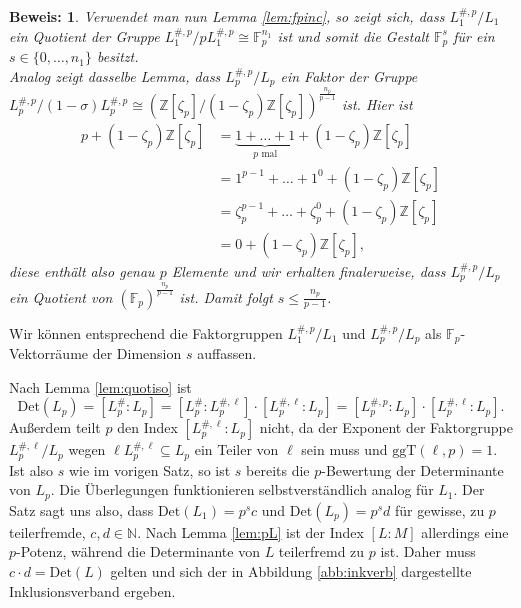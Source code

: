 \documentclass[12pt,a4paper,halfparskip,headsepline,bibtotocnumbered]{scrreprt}
\theoremstyle{nummermitklammern}
\theoremstyle{nonumberbreak}
\newtheorem{beweis}{Beweis:}
\newcommand{\N}{\mathbb{N}}
\newcommand{\Z}{\mathbb{Z}}
\newcommand{\F}{\mathbb{F}}
\newcommand{\Det}{\text{Det}}
\newcommand{\ggT}{\text{ggT}}
\begin{document}
\begin{beweis}
	Verwendet man nun Lemma \eqref{lem:fpinc}, so zeigt sich, dass $L_1^{\#, p} / L_1$ ein Quotient der Gruppe $L_1^{\#, p} / p L_1^{\#,p} \cong \F_p^{n_1}$ ist und somit die Gestalt $\F_p^s$ für ein $s \in \lbrace 0, \dots, n_1 \rbrace$ besitzt.\\
	Analog zeigt dasselbe Lemma, dass $L_p^{\#,p} / L_p$ ein Faktor der Gruppe $L_p^{\#,p} / (1 - \sigma) L_p^{\#,p} \cong (\Z\left[ \zeta_p \right] / (1 - \zeta_p) \Z\left[ \zeta_p \right])^\frac{n_p}{p-1}$ ist. Hier ist
	\begin{align*}
		p + (1 - \zeta_p) \Z\left[ \zeta_p \right] &= \underbrace{1 + \dots + 1}_{p \text{ mal}} + (1 - \zeta_p) \Z\left[ \zeta_p \right]\\
		&= 1^{p-1} + \dots + 1^0 + (1 - \zeta_p) \Z\left[ \zeta_p \right]\\
		 &= \zeta_p^{p-1} + \dots + \zeta_p^0 + (1 - \zeta_p) \Z\left[ \zeta_p \right]\\
		 &= 0 + (1 - \zeta_p) \Z\left[ \zeta_p \right],
	\end{align*}
	diese enthält also genau $p$ Elemente und wir erhalten finalerweise, dass $L_p^{\#, p} / L_p$ ein Quotient von $(\F_p)^\frac{n_p}{p-1}$ ist. Damit folgt $s \leq \frac{n_p}{p-1}$.
\end{beweis}

Wir können entsprechend die Faktorgruppen $L_1^{\#,p} / L_1$ und $L_p^{\#,p} / L_p$ als $\F_p$-Vektorräume der Dimension $s$ auffassen.\par
Nach Lemma \eqref{lem:quotiso} ist
\begin{equation*}
	\Det(L_p) = \left[ L_p^\# : L_p \right] = \left[ L_p^\# : L_p^{\#,\ell} \right] \cdot \left[ L_p^{\#, \ell} : L_p \right] = \left[ L_p^{\#,p} : L_p \right] \cdot \left[ L_p^{\#, \ell} : L_p \right].
\end{equation*}
Außerdem teilt $p$ den Index $\left[ L_p^{\#, \ell} : L_p \right]$ nicht, da der Exponent der Faktorgruppe $L_p^{\#, \ell} / L_p$ wegen $\ell L_p^{\#, \ell} \subseteq L_p$ ein Teiler von $\ell$ sein muss und $\ggT(\ell,p) = 1$. Ist also $s$ wie im vorigen Satz, so ist $s$ bereits die $p$-Bewertung der Determinante von $L_p$. Die Überlegungen funktionieren selbstverständlich analog für $L_1$. Der Satz sagt uns also, dass $\Det(L_1) = p^s c$ und $\Det(L_p) = p^s d$ für gewisse, zu $p$ teilerfremde, $c, d \in \N$. Nach Lemma \eqref{lem:pL} ist der Index $\left[ L : M \right]$ allerdings eine $p$-Potenz, während die Determinante von $L$ teilerfremd zu $p$ ist. Daher muss $c \cdot d = \Det(L)$ gelten und sich der in Abbildung \eqref{abb:inkverb} dargestellte Inklusionsverband ergeben.
\end{document}
